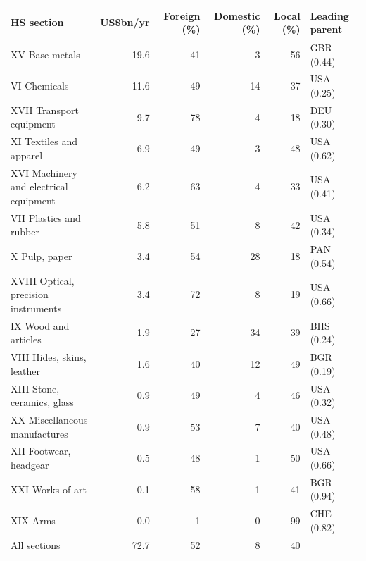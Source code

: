 \begin{tabular}{@{}p{7.2cm} r r r r l@{}}
\toprule
HS section & US\$bn/yr & Foreign (\%) & Domestic (\%) & Local (\%) & Leading parent \\
\midrule
XV Base metals & 19.6 & 41 & 3 & 56 & GBR (0.44) \\
VI Chemicals & 11.6 & 49 & 14 & 37 & USA (0.25) \\
XVII Transport equipment & 9.7 & 78 & 4 & 18 & DEU (0.30) \\
XI Textiles and apparel & 6.9 & 49 & 3 & 48 & USA (0.62) \\
XVI Machinery and electrical equipment & 6.2 & 63 & 4 & 33 & USA (0.41) \\
VII Plastics and rubber & 5.8 & 51 & 8 & 42 & USA (0.34) \\
X Pulp, paper & 3.4 & 54 & 28 & 18 & PAN (0.54) \\
XVIII Optical, precision instruments & 3.4 & 72 & 8 & 19 & USA (0.66) \\
IX Wood and articles & 1.9 & 27 & 34 & 39 & BHS (0.24) \\
VIII Hides, skins, leather & 1.6 & 40 & 12 & 49 & BGR (0.19) \\
XIII Stone, ceramics, glass & 0.9 & 49 & 4 & 46 & USA (0.32) \\
XX Miscellaneous manufactures & 0.9 & 53 & 7 & 40 & USA (0.48) \\
XII Footwear, headgear & 0.5 & 48 & 1 & 50 & USA (0.66) \\
XXI Works of art & 0.1 & 58 & 1 & 41 & BGR (0.94) \\
XIX Arms & 0.0 & 1 & 0 & 99 & CHE (0.82) \\
\midrule
All sections & 72.7 & 52 & 8 & 40 & \\
\bottomrule
\end{tabular}
